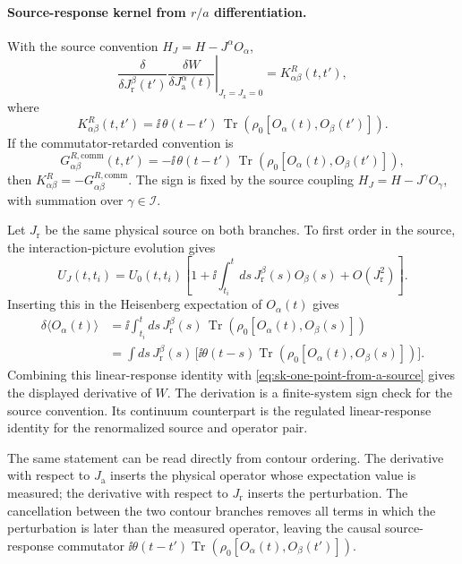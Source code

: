 \paragraph{\texorpdfstring{Source-response kernel from \(r/a\) differentiation}{Source-response kernel from r/a differentiation}.}
With the source convention \(H_J=H-J^\alpha O_\alpha\),
\begin{equation}
  \left.
  \frac{\delta}{\delta J_{\mathrm r}^\beta(t')}
  \frac{\delta W}{\delta J_{\mathrm a}^\alpha(t)}
  \right|_{J_{\mathrm r}=J_{\mathrm a}=0}
  =
  K^R_{\alpha\beta}(t,t'),
  \label{eq:sk-retarded-kernel-from-ra}
\end{equation}
where
\begin{equation}
  K^R_{\alpha\beta}(t,t')
  =
  \ii\,\theta(t-t')\,
  \operatorname{Tr}\!\left(\rho_0[O_\alpha(t),O_\beta(t')]\right).
  \label{eq:sk-source-response-kernel}
\end{equation}
If the commutator-retarded convention is
\[
  G^{R,\mathrm{comm}}_{\alpha\beta}(t,t')
  =
  -\ii\,\theta(t-t')\,
  \operatorname{Tr}\!\left(\rho_0[O_\alpha(t),O_\beta(t')]\right),
\]
then \(K^R_{\alpha\beta}=-G^{R,\mathrm{comm}}_{\alpha\beta}\).  The sign is
fixed by the source coupling \(H_J=H-J^\gamma O_\gamma\), with summation over
\(\gamma\in\mathcal I\).

Let \(J_{\mathrm r}\) be the same physical source on both branches.  To first
order in the source, the interaction-picture evolution gives
\[
  U_J(t,t_i)
  =
  U_0(t,t_i)
  \left[
    1+\ii\int_{t_i}^{t}ds\,J_{\mathrm r}^\beta(s)O_\beta(s)
    +O(J_{\mathrm r}^2)
  \right].
\]
Inserting this in the Heisenberg expectation of \(O_\alpha(t)\) gives
\[
\begin{aligned}
  \delta\langle O_\alpha(t)\rangle
  &=
  \ii\int_{t_i}^{t}ds\,J_{\mathrm r}^\beta(s)\,
  \operatorname{Tr}\!\left(\rho_0[O_\alpha(t),O_\beta(s)]\right)\\
  &=
  \int ds\,J_{\mathrm r}^\beta(s)\,
  \bigl[\ii\theta(t-s)
  \operatorname{Tr}(\rho_0[O_\alpha(t),O_\beta(s)])\bigr].
\end{aligned}
\]
Combining this linear-response identity with
\eqref{eq:sk-one-point-from-a-source} gives the displayed derivative of
\(W\).
The derivation is a finite-system sign check for the source convention.  Its
continuum counterpart is the regulated linear-response identity for the
renormalized source and operator pair.

The same statement can be read directly from contour ordering.  The
derivative with respect to \(J_{\mathrm a}\) inserts the physical operator
whose expectation value is measured; the derivative with respect to
\(J_{\mathrm r}\) inserts the perturbation.  The cancellation between the two
contour branches removes all terms in which the perturbation is later than
the measured operator, leaving the causal source-response commutator
\(\ii\theta(t-t')\operatorname{Tr}(\rho_0[O_\alpha(t),O_\beta(t')])\).

